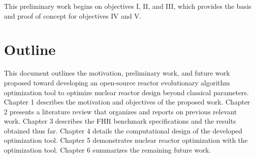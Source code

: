 This preliminary work begins on objectives I, II, and III, which provides 
the basis and proof of concept for objectives IV and V. 

\section{Outline}
This document outlines the motivation, preliminary work, and future work proposed 
toward developing an open-source reactor evolutionary algorithm optimization tool 
to optimize nuclear reactor design beyond classical parameters. 
Chapter 1 describes the motivation and objectives of the proposed work. 
Chapter 2 presents a literature review that organizes and reports on previous 
relevant work. 
Chapter 3 describes the \gls{FHR} benchmark specifications and the results 
obtained thus far. 
Chapter 4 details the computational design of the developed optimization 
tool. 
Chapter 5 demonstrates nuclear reactor optimization with the optimization 
tool.  
Chapter 6 summarizes the remaining future work. 
